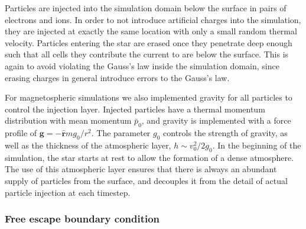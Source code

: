 Particles are injected into the simulation domain below the surface in pairs of
electrons and ions. In order to not introduce artificial charges into the
simulation, they are injected at exactly the same location with only a small
random thermal velocity. Particles entering the star are erased once they
penetrate deep enough such that all cells they contribute the current to are
below the surface. This is again to avoid violating the Gauss's law inside the
simulation domain, since erasing charges in general introduce errors to the
Gauss's law.

For magnetospheric simulations we also implemented gravity for all particles to
control the injection layer. Injected particles have a thermal momentum
distribution with mean momentum $\bar{p}_{0}$, and gravity is implemented with a
force profile of $\mathbf{g} = -\hat{\mathbf{r}}mg_0/r^{2}$. The parameter $g_0$
controls the strength of gravity, as well as the thickness of the atmospheric
layer, $h \sim v_0^{2}/2g_0$. In the beginning of the simulation, the star
starts at rest to allow the formation of a dense atmosphere. The use of this
atmospheric layer ensures that there is always an abundant supply of particles
from the surface, and decouples it from the detail of actual particle injection
at each timestep.

\subsubsection{Free escape boundary condition}
\label{sec:escape-bc}

